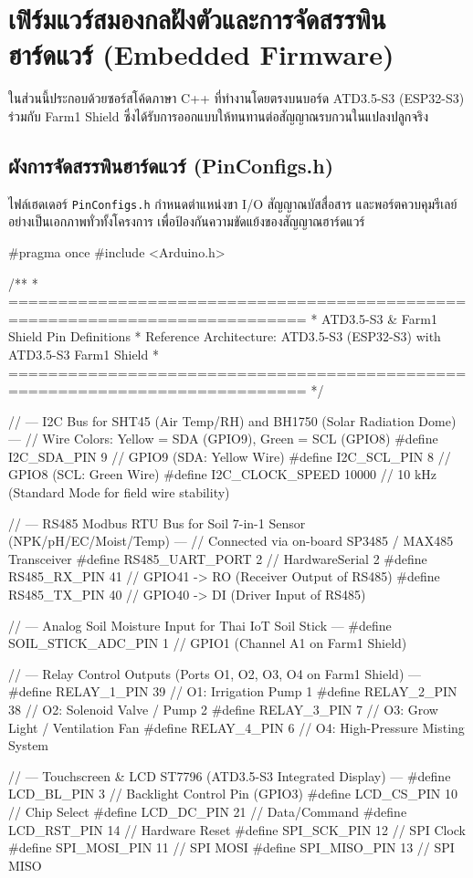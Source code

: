 \newpage
\section{เฟิร์มแวร์สมองกลฝังตัวและการจัดสรรพินฮาร์ดแวร์ (Embedded Firmware)}

ในส่วนนี้ประกอบด้วยซอร์สโค้ดภาษา C++ ที่ทำงานโดยตรงบนบอร์ด ATD3.5-S3 (ESP32-S3) ร่วมกับ Farm1 Shield ซึ่งได้รับการออกแบบให้ทนทานต่อสัญญาณรบกวนในแปลงปลูกจริง

\subsection{ผังการจัดสรรพินฮาร์ดแวร์ (PinConfigs.h)}
ไฟล์เฮดเดอร์ \texttt{PinConfigs.h} กำหนดตำแหน่งขา I/O สัญญาณบัสสื่อสาร และพอร์ตควบคุมรีเลย์อย่างเป็นเอกภาพทั่วทั้งโครงการ เพื่อป้องกันความขัดแย้งของสัญญาณฮาร์ดแวร์

\begin{cppbox}
#pragma once
#include <Arduino.h>

/**
 * ============================================================================
 * ATD3.5-S3 & Farm1 Shield Pin Definitions
 * Reference Architecture: ATD3.5-S3 (ESP32-S3) with ATD3.5-S3 Farm1 Shield
 * ============================================================================
 */

// --- I2C Bus for SHT45 (Air Temp/RH) and BH1750 (Solar Radiation Dome) ---
// Wire Colors: Yellow = SDA (GPIO9), Green = SCL (GPIO8)
#define I2C_SDA_PIN         9       // GPIO9 (SDA: Yellow Wire)
#define I2C_SCL_PIN         8       // GPIO8 (SCL: Green Wire)
#define I2C_CLOCK_SPEED     10000   // 10 kHz (Standard Mode for field wire stability)

// --- RS485 Modbus RTU Bus for Soil 7-in-1 Sensor (NPK/pH/EC/Moist/Temp) ---
// Connected via on-board SP3485 / MAX485 Transceiver
#define RS485_UART_PORT     2       // HardwareSerial 2
#define RS485_RX_PIN        41      // GPIO41 -> RO (Receiver Output of RS485)
#define RS485_TX_PIN        40      // GPIO40 -> DI (Driver Input of RS485)

// --- Analog Soil Moisture Input for Thai IoT Soil Stick ---
#define SOIL_STICK_ADC_PIN  1       // GPIO1 (Channel A1 on Farm1 Shield)

// --- Relay Control Outputs (Ports O1, O2, O3, O4 on Farm1 Shield) ---
#define RELAY_1_PIN         39      // O1: Irrigation Pump 1
#define RELAY_2_PIN         38      // O2: Solenoid Valve / Pump 2
#define RELAY_3_PIN         7       // O3: Grow Light / Ventilation Fan
#define RELAY_4_PIN         6       // O4: High-Pressure Misting System

// --- Touchscreen & LCD ST7796 (ATD3.5-S3 Integrated Display) ---
#define LCD_BL_PIN          3       // Backlight Control Pin (GPIO3)
#define LCD_CS_PIN          10      // Chip Select
#define LCD_DC_PIN          21      // Data/Command
#define LCD_RST_PIN         14      // Hardware Reset
#define SPI_SCK_PIN         12      // SPI Clock
#define SPI_MOSI_PIN        11      // SPI MOSI
#define SPI_MISO_PIN        13      // SPI MISO
\end{cppbox}

